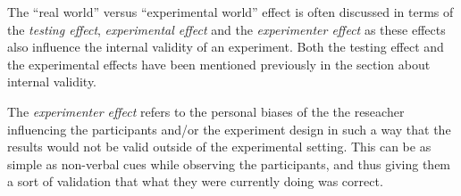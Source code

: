 	\bigskip\noindent
	The "`real world"' versus "`experimental world"' effect is often discussed in terms of the \textit{testing effect}, \textit{experimental effect} and the \textit{experimenter effect} as these effects also influence the internal validity of an experiment. Both the testing effect and the experimental effects have been mentioned previously in the section about internal validity.
	
	\bigskip\noindent
	The \textit{experimenter effect} refers to the personal biases of the the reseacher influencing the participants and/or the experiment design in such a way that the results would not be valid outside of the experimental setting. This can be as simple as non-verbal cues while observing the participants, and thus giving them a sort of validation that what they were currently doing was correct. 